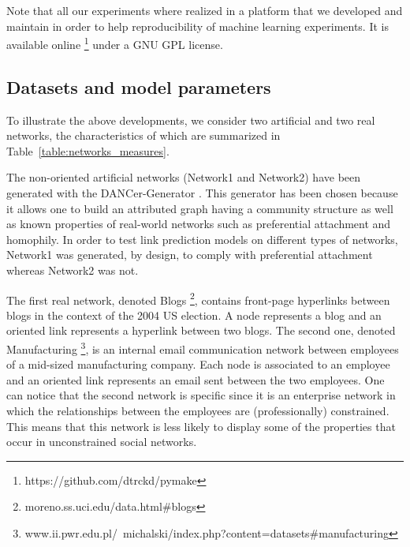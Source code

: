 \documentclass[conference]{IEEEtran}
\begin{document}
Note that all our experiments where realized in a platform that we developed and maintain in order to help reproducibility of machine learning experiments. It is available online \footnote{https://github.com/dtrckd/pymake} under a GNU GPL license.

\subsection{Datasets and model parameters}

To illustrate the above developments, we consider two artificial and two real networks, the characteristics of which are summarized in Table~\ref{table:networks_measures}.



The non-oriented artificial networks (Network1 and Network2) have been generated with the DANCer-Generator \cite{largeron2015}. This generator has been chosen because it allows one to build an attributed graph having a community structure as well as known properties of real-world networks such as preferential attachment and homophily. In order to test link prediction models on different types of networks, Network1 was generated, by design, to comply with preferential attachment whereas Network2 was not.

The first real network, denoted Blogs \footnote{moreno.ss.uci.edu/data.html\#blogs}, contains front-page hyperlinks between blogs in the context of the 2004 US election. A node represents a blog and an oriented link represents a hyperlink between two blogs. The second one, denoted Manufacturing \footnote{www.ii.pwr.edu.pl/~michalski/index.php?content=datasets\#manufacturing}, is an internal email communication network between employees of a mid-sized manufacturing company. Each node is associated to an employee and an oriented link represents an email sent between the two employees. One can notice that the second network is specific since it is an enterprise network in which the relationships between the employees are (professionally) constrained. This means that this network is less likely to display some of the properties that occur in unconstrained social networks.
\end{document}
